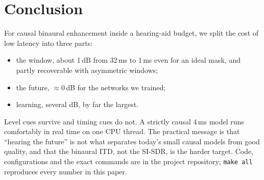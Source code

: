 \section{Conclusion}
For causal binaural enhancement inside a hearing-aid budget, we split the
cost of low latency into three parts:
\begin{itemize}
\item the window, about 1\,dB from 32\,ms to 1\,ms even for an ideal mask,
and partly recoverable with asymmetric windows;
\item the future, $\approx$0\,dB for the networks we trained;
\item learning, several dB, by far the largest.
\end{itemize}
Level cues survive and timing cues do not. A strictly causal 4\,ms model
runs comfortably in real time on one CPU thread. The practical message is
that ``hearing the future'' is not what separates today's small causal
models from good quality, and that the binaural ITD, not the SI-SDR, is the
harder target. Code, configurations and the exact commands are in the
project repository; \texttt{make all} reproduces every number in this
paper.
